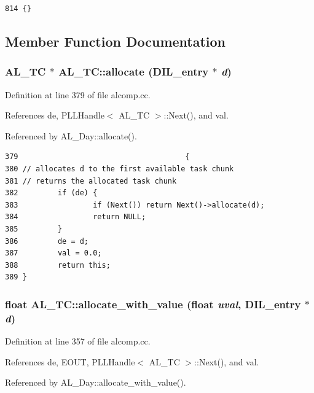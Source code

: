 \footnotesize\begin{verbatim}814 {} 
\end{verbatim}\normalsize 


\subsection{Member Function Documentation}
\subsubsection{\setlength{\rightskip}{0pt plus 5cm}AL\_\-TC $\ast$ AL\_\-TC::allocate ({\bf DIL\_\-entry} $\ast$ {\em d})}\label{classAL__TC_a11}




Definition at line 379 of file alcomp.cc.

References de, PLLHandle$<$ AL\_\-TC $>$::Next(), and val.

Referenced by AL\_\-Day::allocate().



\footnotesize\begin{verbatim}379                                      {
380 // allocates d to the first available task chunk
381 // returns the allocated task chunk
382         if (de) {
383                 if (Next()) return Next()->allocate(d);
384                 return NULL;
385         }
386         de = d;
387         val = 0.0;
388         return this;
389 }
\end{verbatim}\normalsize 
{}
\subsubsection{\setlength{\rightskip}{0pt plus 5cm}float AL\_\-TC::allocate\_\-with\_\-value (float {\em uval}, {\bf DIL\_\-entry} $\ast$ {\em d})}\label{classAL__TC_a9}




Definition at line 357 of file alcomp.cc.

References de, EOUT, PLLHandle$<$ AL\_\-TC $>$::Next(), and val.

Referenced by AL\_\-Day::allocate\_\-with\_\-value().



